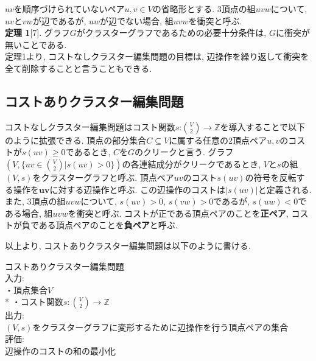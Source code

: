 \documentclass[10.5,a4paper,titlepage, dvipdfmx]{bxjsarticle}
\begin{document}
$uv$を順序づけられていないペア${u,v} \in V$の省略形とする.
3頂点の組$uvw$について, $uv$と$vw$が辺であるが, $uw$が辺でない場合, 組$uvw$を$\textbf{衝突}$と呼ぶ.\\

\textbf{定理 1}[7]. グラフ$G$が$\textbf{クラスターグラフ}$であるための必要十分条件は, $G$に衝突が無いことである.\\

定理1より, コストなしクラスター編集問題の目標は, 辺操作を繰り返して衝突を全て削除することと言うこともできる.


\subsection{コストありクラスター編集問題}
コストなしクラスター編集問題はコスト関数$s$:$\binom{V}{2} \rightarrow \mathbb{Z}$を導入することで以下のように拡張できる.
頂点の部分集合$C \subseteq V$に属する任意の2頂点ペア$u,v$のコストが$s(uv) \ge 0$であるとき, $C$を$G$の$\textbf{クリーク}$と言う.
グラフ$(V,\{uv \in \binom{V}{2} | s(uv) > 0 \})$の各連結成分がクリークであるとき, $V$と$s$の組$(V,s)$を$\textbf{クラスターグラフ}$と呼ぶ.
頂点ペア$uv$のコスト$s(uv)$の符号を反転する操作を$\textbf{uvに対する辺操作}$と呼ぶ. この辺操作のコストは$|s(uv)|$と定義される.
また, 3頂点の組$uvw$について, $s(uv) > 0$, $s(vw) > 0$であるが, $s(uw) < 0$である場合, 組$uvw$を$\textbf{衝突}$と呼ぶ.
コストが正である頂点ペアのことを\textbf{正ペア}, コストが負である頂点ペアのことを\textbf{負ペア}と呼ぶ.\par
以上より, コストありクラスター編集問題は以下のように書ける.\\

\begin{screen}
    $\textbf{コストありクラスター編集問題}$ \\
    入力: \\
    \hspace{15pt} ・頂点集合$V$ \\*
    \hspace{15pt} ・コスト関数$s: \binom{V}{2} \rightarrow \mathbb{Z} $\\
    出力: \\
    \hspace{15pt} $(V,s)$をクラスターグラフに変形するために辺操作を行う頂点ペアの集合\\
    評価: \\
    \hspace{15pt} 辺操作のコストの和の最小化
\end{screen}
\end{document}
